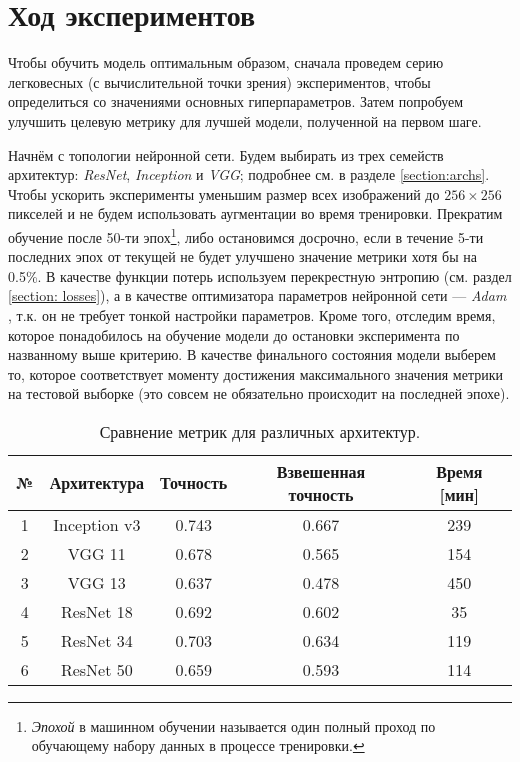 \section{Ход экспериментов}

\indent
\indent
Чтобы обучить модель оптимальным образом, сначала проведем серию
легковесных (с вычислительной точки зрения) экспериментов, чтобы определиться 
со значениями основных гиперпараметров. Затем попробуем улучшить целевую метрику
для лучшей модели, полученной на первом шаге.

\indent
\indent
Начнём с топологии нейронной сети. Будем выбирать из трех семейств архитектур:
 \textit{ResNet}, \textit{Inception} и \textit{VGG}; подробнее см. в разделе \ref{section:archs}.
Чтобы ускорить эксперименты уменьшим размер всех изображений до
$256 \times 256$ пикселей и не будем использовать аугментации во время тренировки.
Прекратим обучение после 50-ти
эпох\footnote{\textit{Эпохой} в машинном обучении называется один полный проход по
обучающему набору данных в процессе тренировки.}, либо остановимся досрочно,
если в течение 5-ти последних эпох от текущей не будет улучшено 
значение метрики хотя бы на 0.5\%. В качестве функции потерь используем
 перекрестную энтропию (см. раздел \ref{section: losses}),
 а в качестве оптимизатора параметров 
нейронной сети --- \textit{Adam} \cite{adam}, т.к. он не требует тонкой настройки
параметров. Кроме того, отследим время, которое 
понадобилось на обучение модели до остановки эксперимента 
по названному выше критерию. В качестве финального состояния модели выберем
то, которое соответствует моменту достижения максимального значения метрики
на тестовой выборке (это совсем не обязательно происходит на последней эпохе).


\begin{table}[h!]
    \begin{center}
        \begin{tabular}{c | c| c | c | c}
            \hline
            № & Архитектура & Точность & Взвешенная точность  & Время [мин] \\
            \hline
    
            1 & Inception v3 & 0.743 & 0.667 & 239 \\
            
            2 & VGG 11 & 0.678 & 0.565 & 154 \\
            
            3 & VGG 13 & 0.637 & 0.478 & 450 \\
            
            4 & ResNet 18 & 0.692 & 0.602 & 35 \\
            
            5 & ResNet 34 & 0.703 & 0.634 & 119 \\
            
            6 & ResNet 50 & 0.659 & 0.593 & 114 \\
    
            \hline
        \end{tabular}
    \end{center}
    \caption{Сравнение метрик для различных архитектур.}
    \label{tabular: arch_compare}
\end{table}


